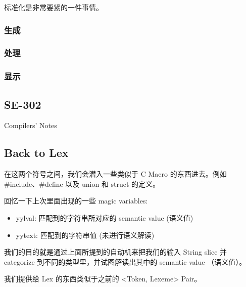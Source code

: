 \documentclass[
]{article}
\newenvironment{Shaded}{}{}
\newcommand{\BaseNTok}[1]{\textcolor[rgb]{0.25,0.63,0.44}{#1}}
\begin{document}
标准化是非常要紧的一件事情。

\hypertarget{header-n60}{%
\subsubsection{生成}\label{header-n60}}

\hypertarget{header-n61}{%
\subsubsection{处理}\label{header-n61}}

\hypertarget{header-n62}{%
\subsubsection{显示}\label{header-n62}}

\hypertarget{header-n63}{%
\subsection{SE-302}\label{header-n63}}

Compilers' Notes

\hypertarget{header-n65}{%
\subsection{Back to Lex}\label{header-n65}}

\begin{Shaded}
\begin{Highlighting}[]
\BaseNTok{%\{}

\BaseNTok{%\}}
\end{Highlighting}
\end{Shaded}

在这两个符号之间，我们会潜入一些类似于 C Macro 的东西进去。例如
\#include、\#define 以及 union 和 struct 的定义。

回忆一下上次里面出现的一些 magic variables:

\begin{itemize}
\item
  yylval: 匹配到的字符串所对应的 semantic value (语义值)
\item
  yytext: 匹配到的字符串值 (未进行语义解读)
\end{itemize}

我们的目的就是通过上面所提到的自动机来把我们的输入 String slice 并
categorize 到不同的类型里，并试图解读出其中的 semantic value
（语义值）。

我们提供给 Lex 的东西类似于之前的 \textless Token, Lexeme\textgreater{}
Pair。
\end{document}
